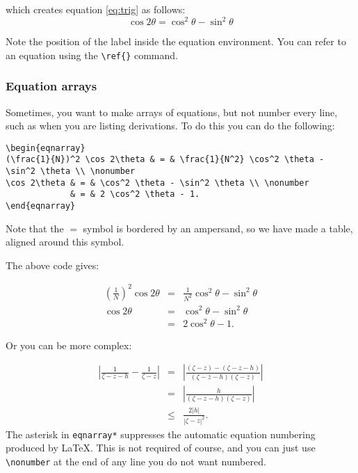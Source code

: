 which creates equation \ref{eq:trig} as follows:
\begin{equation}
\cos 2\theta = \cos^2 \theta - \sin^2 \theta 
\label{eq:trig}
\end{equation}

Note the position of the label inside the equation environment.
You can refer to an equation using the \verb|\ref{}| command.

\subsubsection{Equation arrays}

Sometimes, you want to make arrays of equations, but not
number every line, such as when you are listing derivations.
To do this you can do the following:

\begin{verbatim}
\begin{eqnarray}
(\frac{1}{N})^2 \cos 2\theta & = & \frac{1}{N^2} \cos^2 \theta - \sin^2 \theta \\ \nonumber
\cos 2\theta & = & \cos^2 \theta - \sin^2 \theta \\ \nonumber
             & = & 2 \cos^2 \theta - 1.
\end{eqnarray}
\end{verbatim}

Note that the $=$ symbol is bordered by an ampersand, so we
have made a table, aligned around this symbol.

The above code gives:

\begin{eqnarray}
(\frac{1}{N})^2 \cos 2\theta & = & \frac{1}{N^2} \cos^2 \theta - \sin^2 \theta \\ \nonumber
\cos 2\theta & = & \cos^2 \theta - \sin^2 \theta \\ \nonumber
             & = & 2 \cos^2 \theta - 1. 
\end{eqnarray}


Or you can be more complex:

\begin{eqnarray*}
\left| \frac{1}{\zeta - z - h} - \frac{1}{\zeta - z} \right|
& = & \left| \frac{(\zeta - z) - (\zeta - z - h)}{(\zeta - z - h)(\zeta - z)} \right| \\  
 & = & \left| \frac{h}{(\zeta - z - h)(\zeta - z)} \right| \\
 & \leq & \frac{2 |h|}{|\zeta - z|^2}.
\end{eqnarray*}
The asterisk in \verb|eqnarray*| suppresses the automatic 
equation numbering produced by \LaTeX. This is not required
of course, and you can just use \verb|\nonumber| at the end of 
any line you do not want numbered.


